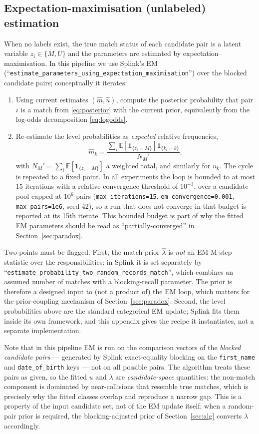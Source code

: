 \documentclass[11pt]{article}
\begin{document}
\subsection{Expectation-maximisation (unlabeled) estimation}
When no labels exist, the true match status of each candidate pair is a latent variable
$z_i\in\{M,U\}$ and the parameters are estimated by expectation--maximisation. In this
pipeline we use Splink's EM (``\texttt{estimate\_parameters\_using\_expectation\_maximisation}'')
over the blocked candidate pairs; conceptually it iterates:
\begin{enumerate}
\item[\textbf{E-step.}] Using current estimates $(\hat m,\hat u)$, compute the posterior
probability that pair $i$ is a match from \eqref{eq:posterior} with the current prior,
equivalently from the log-odds decomposition \eqref{eq:logodds}.
\item[\textbf{M-step.}] Re-estimate the level probabilities as \emph{expected} relative
frequencies,
\begin{equation}
\hat m_k=\frac{\sum_{i}\mathbb E[ \mathbf 1_{\{z_i=M\}}]\mathbf 1_{\{k_i=k\}}}{N_M'},
\end{equation}
with $N_M'=\sum_i \mathbb E[\mathbf 1_{\{z_i=M\}}]$ a weighted total, and similarly for
$u_k$. The cycle is repeated to a fixed point. In all experiments the loop is bounded to at
most $15$ iterations with a relative-convergence threshold of $10^{-3}$, over a candidate
pool capped at $10^6$ pairs
(\texttt{max\_iterations=15}, \texttt{em\_convergence=0.001}, \texttt{max\_pairs=1e6}, seed 42),
so a run that does not converge in that budget is reported at its 15th iterate. This bounded
budget is part of why the fitted EM parameters should be read as ``partially-converged'' in
Section~\ref{sec:paradox}.
\end{enumerate}
Two points must be flagged. First, the match prior $\hat\lambda$ is \emph{not} an EM
M-step statistic over the responsibilities: in Splink it is set separately by
``\texttt{estimate\_probability\_two\_random\_records\_match}'', which combines an assumed
number of matches with a blocking-recall parameter. The prior is therefore a designed
input to (not a product of) the EM loop, which matters for the prior-coupling mechanism of
Section~\ref{sec:paradox}. Second, the level probabilities above are the standard
categorical EM update; Splink fits them inside its own framework, and this appendix gives
the recipe it instantiates, not a separate implementation.

Note that in this pipeline EM is run on the comparison vectors of the \emph{blocked
candidate pairs} --- generated by Splink exact-equality blocking on the
\texttt{first\_name} and \texttt{date\_of\_birth} keys --- not on all possible pairs. The
algorithm treats these pairs as given, so the fitted $u$ and $\lambda$ are
\emph{candidate-space} quantities: the non-match component is dominated by near-collisions
that resemble true matches, which is precisely why the fitted classes overlap and reproduce a
narrow gap. This is a property of the input candidate set, not of the EM update itself; when
a random-pair prior is required, the blocking-adjusted prior of Section~\ref{sec:alg}
converts $\lambda$ accordingly.
\end{document}
